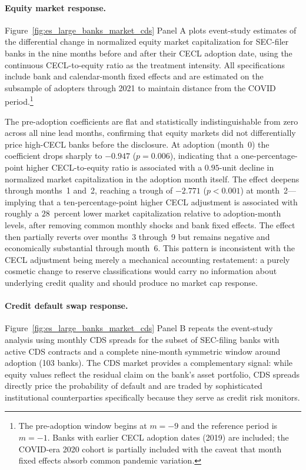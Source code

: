 \paragraph{Equity market response.}
Figure~\ref{fig:es_large_banks_market_cds} Panel A plots event-study estimates of the
differential change in normalized equity market capitalization for SEC-filer banks
in the nine months before and after their CECL adoption date, using the
continuous CECL-to-equity ratio as the treatment intensity. All specifications
include bank and calendar-month fixed effects and are estimated on the subsample
of adopters through 2021 to maintain distance from the COVID period.\footnote{The
pre-adoption window begins at $m = -9$ and the reference period is $m = -1$.
Banks with earlier CECL adoption dates (2019) are included; the COVID-era 2020
cohort is partially included with the caveat that month fixed effects absorb
common pandemic variation.}

The pre-adoption coefficients are flat and statistically indistinguishable from
zero across all nine lead months, confirming that equity markets did not
differentially price high-CECL banks before the disclosure. At adoption
(month~0) the coefficient drops sharply to $-0.947$ ($p = 0.006$), indicating
that a one-percentage-point higher CECL-to-equity ratio is associated with a
$0.95$-unit decline in normalized market capitalization in the adoption month
itself. The effect deepens through months~1 and~2, reaching a trough of
$-2.771$ ($p < 0.001$) at month~2---implying that a ten-percentage-point higher
CECL adjustment is associated with roughly a $28$~percent lower market
capitalization relative to adoption-month levels, after removing common monthly
shocks and bank fixed effects. The effect then partially reverts over months~3
through~9 but remains negative and economically substantial through month~6. This
pattern is inconsistent with the CECL adjustment being merely a mechanical
accounting restatement: a purely cosmetic change to reserve classifications would
carry no information about underlying credit quality and should produce no
market cap response.

\paragraph{Credit default swap response.}
Figure~\ref{fig:es_large_banks_market_cds} Panel B repeats the event-study analysis using
monthly CDS spreads for the subset of SEC-filing banks with active CDS contracts
and a complete nine-month symmetric window around adoption (103 banks). The CDS
market provides a complementary signal: while equity values reflect the residual
claim on the bank's asset portfolio, CDS spreads directly price the probability
of default and are traded by sophisticated institutional counterparties
specifically because they serve as credit risk monitors.

